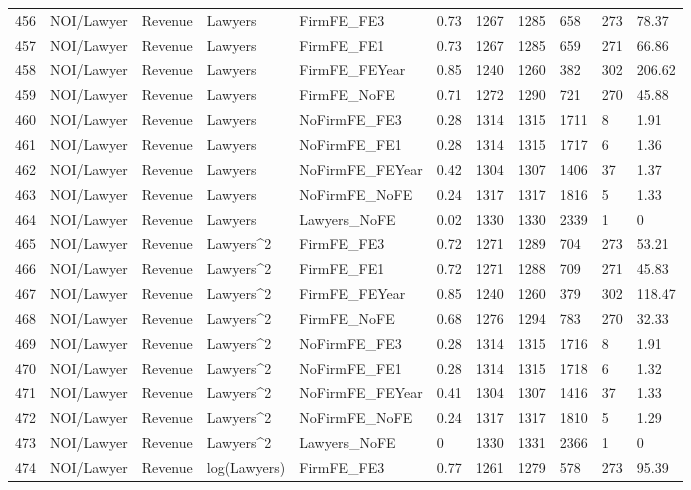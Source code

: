 \documentclass{article}
\begin{document}
\begin{table}[H]
\begin{tabular}{rllllllllll}
  456 & NOI/Lawyer & Revenue & Lawyers & FirmFE\_FE3 & 0.73 & 1267 & 1285 & 658 & 273 & 78.37 \\ 
  457 & NOI/Lawyer & Revenue & Lawyers & FirmFE\_FE1 & 0.73 & 1267 & 1285 & 659 & 271 & 66.86 \\ 
  458 & NOI/Lawyer & Revenue & Lawyers & FirmFE\_FEYear & 0.85 & 1240 & 1260 & 382 & 302 & 206.62 \\ 
  459 & NOI/Lawyer & Revenue & Lawyers & FirmFE\_NoFE & 0.71 & 1272 & 1290 & 721 & 270 & 45.88 \\ 
  460 & NOI/Lawyer & Revenue & Lawyers & NoFirmFE\_FE3 & 0.28 & 1314 & 1315 & 1711 & 8 & 1.91 \\ 
  461 & NOI/Lawyer & Revenue & Lawyers & NoFirmFE\_FE1 & 0.28 & 1314 & 1315 & 1717 & 6 & 1.36 \\ 
  462 & NOI/Lawyer & Revenue & Lawyers & NoFirmFE\_FEYear & 0.42 & 1304 & 1307 & 1406 & 37 & 1.37 \\ 
  463 & NOI/Lawyer & Revenue & Lawyers & NoFirmFE\_NoFE & 0.24 & 1317 & 1317 & 1816 & 5 & 1.33 \\ 
  464 & NOI/Lawyer & Revenue & Lawyers & Lawyers\_NoFE & 0.02 & 1330 & 1330 & 2339 & 1 & 0 \\ 
  465 & NOI/Lawyer & Revenue & Lawyers^2 & FirmFE\_FE3 & 0.72 & 1271 & 1289 & 704 & 273 & 53.21 \\ 
  466 & NOI/Lawyer & Revenue & Lawyers^2 & FirmFE\_FE1 & 0.72 & 1271 & 1288 & 709 & 271 & 45.83 \\ 
  467 & NOI/Lawyer & Revenue & Lawyers^2 & FirmFE\_FEYear & 0.85 & 1240 & 1260 & 379 & 302 & 118.47 \\ 
  468 & NOI/Lawyer & Revenue & Lawyers^2 & FirmFE\_NoFE & 0.68 & 1276 & 1294 & 783 & 270 & 32.33 \\ 
  469 & NOI/Lawyer & Revenue & Lawyers^2 & NoFirmFE\_FE3 & 0.28 & 1314 & 1315 & 1716 & 8 & 1.91 \\ 
  470 & NOI/Lawyer & Revenue & Lawyers^2 & NoFirmFE\_FE1 & 0.28 & 1314 & 1315 & 1718 & 6 & 1.32 \\ 
  471 & NOI/Lawyer & Revenue & Lawyers^2 & NoFirmFE\_FEYear & 0.41 & 1304 & 1307 & 1416 & 37 & 1.33 \\ 
  472 & NOI/Lawyer & Revenue & Lawyers^2 & NoFirmFE\_NoFE & 0.24 & 1317 & 1317 & 1810 & 5 & 1.29 \\ 
  473 & NOI/Lawyer & Revenue & Lawyers^2 & Lawyers\_NoFE & 0 & 1330 & 1331 & 2366 & 1 & 0 \\ 
  474 & NOI/Lawyer & Revenue & log(Lawyers) & FirmFE\_FE3 & 0.77 & 1261 & 1279 & 578 & 273 & 95.39 \\ 

\end{tabular}
\end{table}
\end{document}
